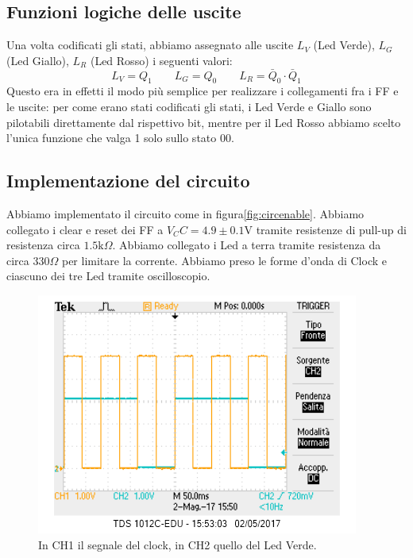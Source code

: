 \documentclass[10pt,a4paper]{article}
\begin{document}
\subsection{Funzioni logiche delle uscite}
Una volta codificati gli stati, abbiamo assegnato alle uscite $L_V$ (Led Verde), $L_G$ (Led Giallo), $L_R$ (Led Rosso) i seguenti valori:
\begin{equation}
L_V = Q_1 \qquad L_G = Q_0 \qquad L_R = \bar{Q}_0\cdot \bar{Q}_1
\end{equation}
Questo era in effetti il modo più semplice per realizzare i collegamenti fra i FF e le uscite: per come erano stati codificati gli stati, i Led Verde e Giallo sono pilotabili direttamente dal rispettivo bit, mentre per il Led Rosso abbiamo scelto l'unica funzione che valga 1 solo sullo stato 00. %
\subsection{Implementazione del circuito}
Abbiamo implementato il circuito come in figura\ref{fig:circenable}.
Abbiamo collegato i clear e reset dei FF a $V_CC = 4.9\pm0.1 $V tramite resistenze di pull-up di resistenza circa $1.5\mbox{k}\Omega$.
Abbiamo collegato i Led a terra tramite resistenza da circa $330\Omega$ per limitare la corrente.  
Abbiamo preso le forme d'onda di Clock e ciascuno dei tre Led tramite oscilloscopio.
\begin{figure}[!htb]
\centering
\includegraphics[scale=0.7]{clock-verde.png}
\caption{In CH1 il segnale del clock, in CH2 quello del Led Verde.\label{fig:verde}}
\end{figure}
\end{document}
